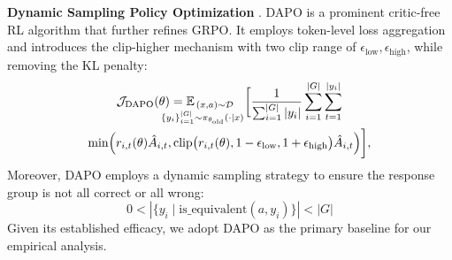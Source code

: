 \noindent\textbf{Dynamic Sampling Policy Optimization} \citep[\textbf{DAPO},][]{DAPO}. DAPO is a prominent critic-free RL algorithm that further refines GRPO. 
It employs token-level loss aggregation and introduces the clip-higher mechanism with two clip range of  $\epsilon_\text{low}, \epsilon_\text{high}$, while removing the KL penalty:
\begin{gather}\label{eqn:DAPO}
   \mathcal J_\text{DAPO}(\theta) = \mathbb E_{
    \mathmakebox[4em][r]{
        \substack{ 
        \hspace{2em}(x,a)\sim\mathcal{D}\\
        \{y_i\}_{i=1}^{|G|} \sim\pi_{\theta_{\text{old}}}(\cdot|x)
        }
    }}\bigg[
     \frac{1}{\sum_{i=1}^{|G|} |y_i|} \sum_{i=1}^{|G|} \sum_{t=1}^{|y_i|}  \\
    \min \Bigl( r_{i,t}(\theta)\hat{A}_{i,t}, \text{clip}\bigl(r_{i,t}(\theta), 1-\epsilon_\text{low}, 1+\epsilon_\text{high}\bigr)\hat{A}_{i,t} \Bigr) \bigg],\notag
\end{gather}
Moreover, DAPO employs a dynamic sampling strategy to ensure the response group is not all correct or all wrong:
$$
0 < \left|\{y_i \mid \text{is\_equivalent}(a, y_i)\}\right| < {|G|}
$$
Given its established efficacy, we adopt DAPO as the primary baseline for our empirical analysis.

